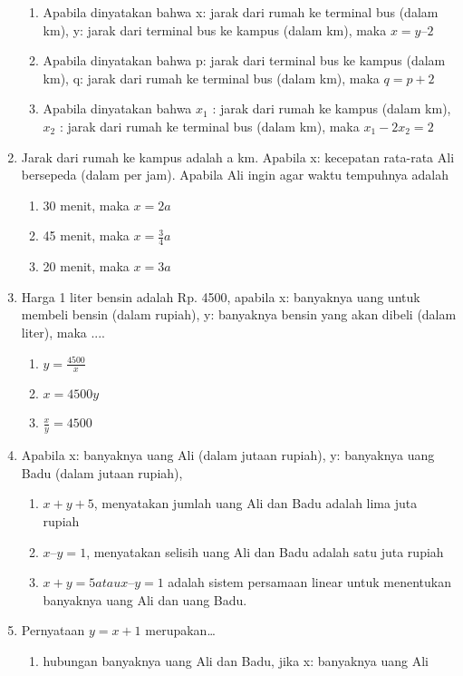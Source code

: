 \documentclass[10pt]{article}
\begin{document}
\begin{enumerate}
\begin{enumerate}
    \item Apabila dinyatakan bahwa x: jarak dari rumah ke terminal bus
    (dalam km), y: jarak dari terminal bus ke kampus (dalam km),
    maka $x=y–2$
    \item Apabila dinyatakan bahwa p: jarak dari terminal bus ke kampus
    (dalam km), q: jarak dari rumah ke terminal bus (dalam km), maka
    $q=p+2$
    \item Apabila dinyatakan bahwa $x_1$ : jarak dari rumah ke kampus (dalam
    km), $x_2$ : jarak dari rumah ke terminal bus (dalam km), maka
    $x_1-2x_2 =2$
\end{enumerate}
\item Jarak dari rumah ke kampus adalah a km. Apabila x: kecepatan rata-rata
Ali bersepeda (dalam per jam). Apabila Ali ingin agar waktu tempuhnya
adalah \begin{enumerate}
    \item 30 menit, maka $x=2a$
    \item 45 menit, maka $x=\frac{3}{4}a$
    \item 20 menit, maka $x=3a$
\end{enumerate}
\item Harga 1 liter bensin adalah Rp. 4500, apabila x: banyaknya uang untuk
membeli bensin (dalam rupiah), y: banyaknya bensin yang akan dibeli
(dalam liter), maka ....
\begin{enumerate}
    \item $y=\frac{4500}{x}$
    \item $x=4500y$
    \item $\frac{x}{y}=4500$
\end{enumerate}
\item Apabila x: banyaknya uang Ali (dalam jutaan rupiah),
y: banyaknya uang Badu (dalam jutaan rupiah),
\begin{enumerate}
    \item $x+y+5$, menyatakan jumlah uang Ali dan Badu adalah lima juta
    rupiah
    \item $x – y=1 $, menyatakan selisih uang Ali dan Badu adalah satu juta
    rupiah
    \item $x+y=5 atau x–y= 1$ adalah sistem persamaan linear untuk
    menentukan banyaknya uang Ali dan uang Badu.
\end{enumerate}
\item Pernyataan $y=x+1$ merupakan\dots
\begin{enumerate}
    \item hubungan banyaknya uang Ali dan Badu, jika x: banyaknya uang Ali

\end{enumerate}
\end{enumerate}
\end{document}
